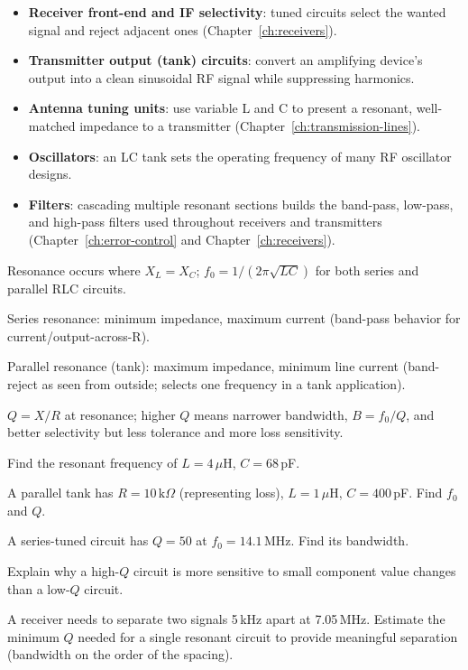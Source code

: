 \begin{itemize}
\item \textbf{Receiver front-end and IF selectivity}: tuned circuits
select the wanted signal and reject adjacent ones (Chapter~\ref{ch:receivers}).
\item \textbf{Transmitter output (tank) circuits}: convert an amplifying
device's output into a clean sinusoidal RF signal while suppressing
harmonics.
\item \textbf{Antenna tuning units}: use variable L and C to present a
resonant, well-matched impedance to a transmitter (Chapter~\ref{ch:transmission-lines}).
\item \textbf{Oscillators}: an LC tank sets the operating frequency of
many RF oscillator designs.
\item \textbf{Filters}: cascading multiple resonant sections builds the
band-pass, low-pass, and high-pass filters used throughout receivers and
transmitters (Chapter~\ref{ch:error-control} and Chapter~\ref{ch:receivers}).
\end{itemize}

\begin{quickreview}
\item Resonance occurs where $X_L = X_C$; $f_0 = 1/(2\pi\sqrt{LC})$ for
both series and parallel RLC circuits.
\item Series resonance: minimum impedance, maximum current (band-pass
behavior for current/output-across-R).
\item Parallel resonance (tank): maximum impedance, minimum line current
(band-reject as seen from outside; selects one frequency in a tank
application).
\item $Q = X/R$ at resonance; higher $Q$ means narrower bandwidth,
$B = f_0/Q$, and better selectivity but less tolerance and more loss
sensitivity.
\end{quickreview}

\begin{practiceproblems}
\item Find the resonant frequency of $L=4\,\mu$H, $C=68\,$pF.
\item A parallel tank has $R=10\,\text{k}\Omega$ (representing loss),
$L=1\,\mu$H, $C=400\,$pF. Find $f_0$ and $Q$.
\item A series-tuned circuit has $Q=50$ at $f_0=14.1\,$MHz. Find its
bandwidth.
\item Explain why a high-$Q$ circuit is more sensitive to small
component value changes than a low-$Q$ circuit.
\item A receiver needs to separate two signals 5\,kHz apart at
7.05\,MHz. Estimate the minimum $Q$ needed for a single resonant circuit
to provide meaningful separation (bandwidth on the order of the spacing).
\end{practiceproblems}
